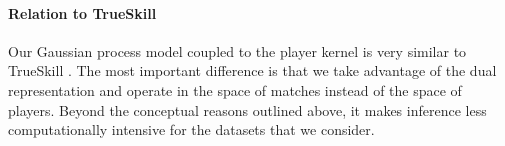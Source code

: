 \paragraph{Relation to TrueSkill}
Our Gaussian process model coupled to the player kernel is very similar to TrueSkill \citep{herbrich2006trueskill}.
The most important difference is that we take advantage of the dual representation and operate in the space of matches instead of the space of players.
Beyond the conceptual reasons outlined above, it makes inference less computationally intensive for the datasets that we consider.
